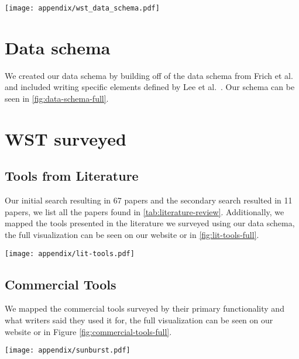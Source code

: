 \begin{figure*}[t]
    \centering
    \texttt{[image: appendix/wst\_data\_schema.pdf]}
    \caption{Data schema used to tag commercial and research WST}
    \label{fig:data-schema-full}
\end{figure*}

\section{Data schema}
\label{appendix:data-schema}
We created our data schema by building off of the data schema from Frich et al.~\cite{frich_mapping_2019} and included writing specific elements defined by Lee et al.~\cite{lee_design_2024}. Our schema can be seen in \autoref{fig:data-schema-full}.

\section{WST surveyed}
\subsection{Tools from Literature}
\label{appendix:lit-tools-full}
Our initial search resulting in 67 papers and the secondary search resulted in 11 papers, we list all the papers found in \autoref{tab:literature-review}. Additionally, we mapped the tools presented in the literature we surveyed using our data schema, the full visualization can be seen on our website or in \autoref{fig:lit-tools-full}. 

\begin{figure*}[t]
    \centering
    \texttt{[image: appendix/lit-tools.pdf]}
    \caption{A list of all the literature ed and tagged by their functionality using our data schema.}
    \label{fig:lit-tools-full}
\end{figure*}



\subsection{Commercial Tools}
\label{appendix:commercial-tools-full}
We mapped the commercial tools surveyed by their primary functionality and what writers\reddit{} said they used it for, the full visualization can be seen on our website or in Figure \ref{fig:commercial-tools-full}.
\begin{figure*}
    \centering
    \small
    \texttt{[image: appendix/sunburst.pdf]}
    \caption{A list of all the commercial tools surveyed and tagged by their purpose of use.}
    \label{fig:commercial-tools-full}
\end{figure*}